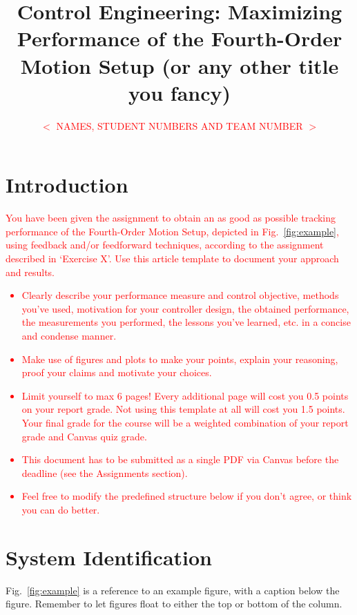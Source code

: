 \documentclass[a4paper,10pt,conference]{ieeeconf}
\title{\LARGE \bf Control Engineering: Maximizing Performance of the Fourth-Order Motion Setup (or any other title you fancy)}
\author{\textcolor{red}{$<$ NAMES, STUDENT NUMBERS AND TEAM NUMBER $>$} }%
\begin{document}
\maketitle 
\thispagestyle{plain}
\pagestyle{plain}


\section{\textbf{Introduction}}

\textcolor{red}{You have been given the assignment to obtain an as good as possible tracking performance of the Fourth-Order Motion Setup, depicted in Fig.~\ref{fig:example}, using feedback and/or feedforward techniques, according to the assignment described in `Exercise X'. Use this article template to document your approach and results.
	\begin{itemize}
		\item Clearly describe your performance measure and control objective, methods you've used, motivation for your controller design, the obtained performance, the measurements you performed, the lessons you've learned, etc. in a concise and condense manner.
		\item Make use of figures and plots to make your points, explain your reasoning, proof your claims and motivate your choices.
		\item Limit yourself to max 6 pages! Every additional page will cost you 0.5 points on your report grade. Not using this template at all will cost you 1.5 points. Your final grade for the course will be a weighted combination of your report grade and Canvas quiz grade.
		\item This document has to be submitted as a single PDF via Canvas before the deadline (see the Assignments section).
		\item Feel free to modify the predefined structure below if you don't agree, or think you can do better.
	\end{itemize} }

\section{\textbf{System Identification}}

Fig.~\ref{fig:example} is a reference to an example figure, with a caption below the figure. Remember to let figures float to either the top or bottom of the column.
\end{document}
